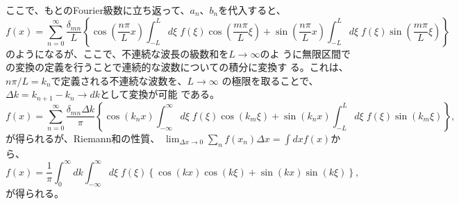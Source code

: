 ここで、もとのFourier級数に立ち返って、$a_n$、$b_n$を代入すると、
\begin{equation}
 f(x) = \sum_{n=0}^{\infty}\frac{\delta_{mn}}{L}
  \left\{\cos \left(\frac{n\pi}{L}x\right)\int_{-L}^{L}d\xi \mspace{5mu} f(\xi) \cos\left(\frac{m\pi}{L}\xi\right)
   + \sin \left(\frac{n\pi}{L}x\right)\int_{-L}^{L}d\xi \mspace{5mu} f(\xi) \sin\left(\frac{m\pi}{L}\xi\right)\right\}
\end{equation}
のようになるが、ここで、不連続な波長の級数和を$L\rightarrow \infty$のよ
うに無限区間での変換の定義を行うことで連続的な波数についての積分に変換す
る。これは、$n\pi/L=k_n$で定義される不連続な波数を、$L\rightarrow\infty$
の極限を取ることで、$\Delta k=k_{n+1}-k_n\rightarrow dk$として変換が可能
である。
\begin{equation}
 f(x) = \sum_{n=0}^{\infty}\frac{\delta_{mn}\Delta k}{\pi}
  \left\{\cos \left(k_nx\right)\int_{-\infty}^{\infty}d\xi \mspace{5mu} f(\xi) \cos\left(k_m\xi\right)
   + \sin \left(k_nx\right)\int_{-L}^{L}d\xi \mspace{5mu} f(\xi) \sin\left(k_m\xi\right)\right\},
\end{equation}
が得られるが、Riemann和の性質、
$\lim_{\Delta x\rightarrow 0} \sum_nf(x_n)\Delta x =\int dx f(x)$から、
\begin{equation}
 f(x) = \frac{1}{\pi}\int_{0}^{\infty}dk\int_{-\infty}^{\infty}d\xi \mspace{5mu} f(\xi) 
  \left\{\cos \left(kx\right)\cos\left(k\xi\right)
   + \sin \left(kx\right) \sin\left(k\xi\right)\right\},
\end{equation}
が得られる。

